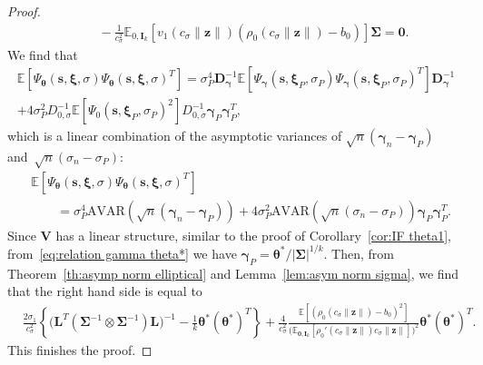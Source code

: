 \documentclass{article}
\numberwithin{equation}{section}
\theoremstyle{plain}
\newcommand{\btheta}{\bm\theta}
\newcommand{\bxi}{\bm\xi}
\newcommand{\bgamma}{\bm\gamma}
\newcommand{\bSigma}{\mathbf{\Sigma}}
\newcommand{\bs}{\mathbf{s}}
\newcommand{\bz}{\mathbf{z}}
\newcommand{\bV}{\mathbf{V}}
\newcommand{\bI}{\mathbf{I}}
\newcommand{\bD}{\mathbf{D}}
\newcommand{\bL}{\mathbf{L}}
\newcommand{\E}{\mathbb{E}}
\begin{document}
\begin{proof}
\[\begin{split}
&\qquad
-
\frac{1}{c_\sigma^2}
\mathbb{E}_{0,\mathbf{I}_k}
\left[
v_1\left(c_\sigma\|\bz\|\right)
\left(
\rho_0\left(c_\sigma\|\bz\|\right)
-
b_0\right)
\right]
\bSigma
=
\mathbf{0}.
\end{split}
\]
We find that
\[
\begin{split}
\E\left[
\Psi_{\btheta}(\bs,\bxi,\sigma)
\Psi_{\btheta}(\bs,\bxi,\sigma)^T
\right]
=
\sigma^4_P
\bD_{\bgamma}^{-1}
\E\left[
\Psi_{\bgamma}(\bs,\bxi_P,\sigma_P)\Psi_{\bgamma}(\bs,\bxi_P,\sigma_P)^T
\right]
\bD_{\bgamma}^{-1}\\
+
4\sigma^2_P
D_{0,\sigma}^{-1}
\E\left[
\Psi_{0}(\bs,\bxi_P,\sigma_P)^2
\right]
D_{0,\sigma}^{-1}
\bgamma_P\bgamma_P^T,
\end{split}
\]
which is a linear combination
of the asymptotic variances of 
$\sqrt{n}(\bgamma_n-\bgamma_P)$ and~$\sqrt{n}(\sigma_n-\sigma_P)$:
\[
\begin{split}
&
\E\left[
\Psi_{\btheta}(\bs,\bxi,\sigma)
\Psi_{\btheta}(\bs,\bxi,\sigma)^T
\right]\\
&\qquad=
\sigma^4_P
\text{AVAR}\left(\sqrt{n}(\bgamma_n-\bgamma_P)\right)
+
4\sigma^2_P
\text{AVAR}\left(\sqrt{n}(\sigma_n-\sigma_P)\right)
\bgamma_P\bgamma_P^T.
\end{split}
\]
Since $\bV$ has a linear structure, similar to the proof of Corollary~\ref{cor:IF theta1},
from~\eqref{eq:relation gamma theta*} we have $\bgamma_P=\btheta^*/|\bSigma|^{1/k}$.
Then, from Theorem~\ref{th:asymp norm elliptical} and Lemma~\ref{lem:asym norm sigma}, 
we find that the right hand side is equal to
\[
\begin{split}
&
\frac{2\sigma_1}{c_\sigma^2}
\left\{
\Big(\bL^T\left(\bSigma^{-1}\otimes\bSigma^{-1}\right)\bL\Big)^{-1}
-
\frac{1}{k}
\btheta^*(\btheta^*)^T
\right\}
+
\frac{4}{c_\sigma^2}
\frac{\E\left[(\rho_0(c_\sigma\|\bz\|)-b_0)^2\right]}{\big(\E_{\mathbf{0},\bI_k}[\rho_0'(c_\sigma\|\bz\|)c_\sigma\|\bz\|]\big)^2}
\btheta^*(\btheta^*)^T.
\end{split}
\]
This finishes the proof.
\end{proof}
\end{document}
